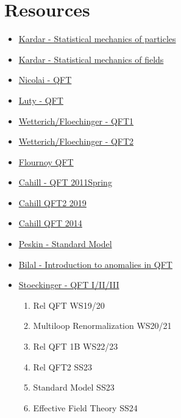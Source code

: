 \documentclass[10pt,a4paper]{book}
\theoremstyle{definition}
\begin{document}
\chapter{Resources}
\begin{itemize}


\item \href{https://ocw.mit.edu/courses/8-333-statistical-mechanics-i-statistical-mechanics-of-particles-fall-2013/video_galleries/video-lectures/}{Kardar - Statistical mechanics of particles}
\item \href{https://ocw.mit.edu/courses/8-334-statistical-mechanics-ii-statistical-physics-of-fields-spring-2014/video_galleries/video-lectures/}{Kardar - Statistical mechanics of fields}

\item \href{https://www.youtube.com/watch?v=seabT438nr0}{Nicolai - QFT}
\item \href{https://www.youtube.com/watch?v=EzfFklLqDjA&t=791s}{Luty - QFT}
\item \href{https://www.tpi.uni-jena.de/~floerchinger/qft1/Lecture01/}{Wetterich/Floechinger - QFT1}
\item \href{https://www.tpi.uni-jena.de/~floerchinger/qft2/lecture01/}{Wetterich/Floechinger - QFT2}
\item \href{https://www.youtube.com/@AlexFlournoyTeacher}{Flournoy QFT}
\item \href{https://www.youtube.com/watch?v=MqG-F6CV7qk&list=PLB6035BED574535DC}{Cahill - QFT 2011Spring}
\item \href{https://www.youtube.com/watch?v=Z4gC4ezAG0Y&list=PLpyIij4nP6QLfC2CsDF8CHzK6HkEkWCze}{Cahill QFT2 2019}
\item \href{https://www.youtube.com/playlist?list=PLpyIij4nP6QKgoKhAWKHZFHrvkFHsFZym}{Cahill QFT 2014}
\item \href{https://www.youtube.com/watch?v=0LWYXkeuy-Q}{Peskin - Standard Model}
\item \href{https://www.youtube.com/watch?v=Q3cHDiZIG44}{Bilal - Introduction to anomalies in QFT}
\item \href{https://www.youtube.com/@qftdominikstoeckinger1285/playlists}{Stoeckinger - QFT I/II/III}
\begin{enumerate}
\item Rel QFT WS19/20
\item Multiloop Renormalization WS20/21
\item Rel QFT 1B WS22/23
\item Rel QFT2 SS23
\item Standard Model SS23
\item Effective Field Theory SS24
\end{enumerate}


\end{itemize}
\end{document}
